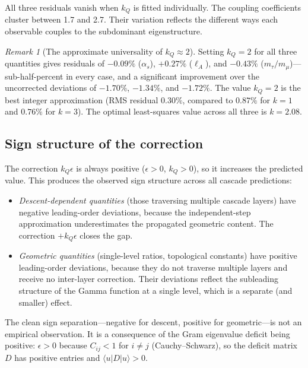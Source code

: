 \documentclass[12pt,a4paper]{article}
\theoremstyle{remark}
\newtheorem*{remark}{Remark}
\begin{document}
\noindent All three residuals vanish when $k_Q$ is fitted individually. The coupling coefficients cluster between 1.7 and 2.7. Their variation reflects the different ways each observable couples to the subdominant eigenstructure.

\begin{remark}[The approximate universality of $k_Q \approx 2$]
Setting $k_Q = 2$ for all three quantities gives residuals of $-0.09\%$ ($\alpha_s$), $+0.27\%$ ($\ell_A$), and $-0.43\%$ ($m_\tau/m_\mu$)---sub-half-percent in every case, and a significant improvement over the uncorrected deviations of $-1.70\%$, $-1.34\%$, and $-1.72\%$. The value $k_Q = 2$ is the best integer approximation (RMS residual $0.30\%$, compared to $0.87\%$ for $k = 1$ and $0.76\%$ for $k = 3$). The optimal least-squares value across all three is $k = 2.08$.
\end{remark}

\subsection{Sign structure of the correction}

The correction $k_Q \epsilon$ is always positive ($\epsilon > 0$, $k_Q > 0$), so it increases the predicted value. This produces the observed sign structure across all cascade predictions:

\begin{itemize}[nosep]
\item \emph{Descent-dependent quantities} (those traversing multiple cascade layers) have negative leading-order deviations, because the independent-step approximation underestimates the propagated geometric content. The correction $+k_Q\epsilon$ closes the gap.
\item \emph{Geometric quantities} (single-level ratios, topological constants) have positive leading-order deviations, because they do not traverse multiple layers and receive no inter-layer correction. Their deviations reflect the subleading structure of the Gamma function at a single level, which is a separate (and smaller) effect.
\end{itemize}

The clean sign separation---negative for descent, positive for geometric---is not an empirical observation. It is a consequence of the Gram eigenvalue deficit being positive: $\epsilon > 0$ because $C_{ij} < 1$ for $i \neq j$ (Cauchy--Schwarz), so the deficit matrix $D$ has positive entries and $\langle u | D | u \rangle > 0$.
\end{document}
